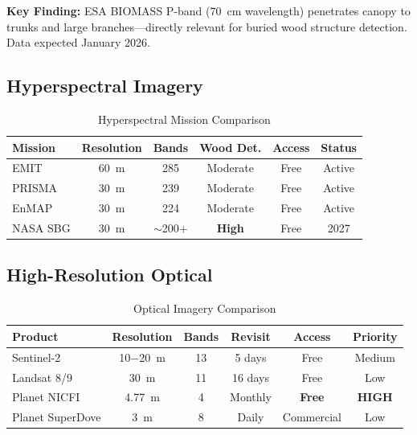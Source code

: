 \documentclass[11pt,letterpaper]{article}
\begin{document}
\textbf{Key Finding:} ESA BIOMASS P-band (\SI{70}{cm} wavelength) penetrates canopy to trunks and large branches---directly relevant for buried wood structure detection. Data expected January 2026.

\subsection{Hyperspectral Imagery}

\begin{table}[h]
\centering
\caption{Hyperspectral Mission Comparison}
\label{tab:hyperspectral_comparison}
\begin{tabular}{p{2.5cm}ccccc}
\toprule
\textbf{Mission} & \textbf{Resolution} & \textbf{Bands} & \textbf{Wood Det.} & \textbf{Access} & \textbf{Status} \\
\midrule
EMIT & \SI{60}{m} & 285 & Moderate & Free & Active \\
PRISMA & \SI{30}{m} & 239 & Moderate & Free & Active \\
EnMAP & \SI{30}{m} & 224 & Moderate & Free & Active \\
\rowcolor{inprogress!30}
NASA SBG & \SI{30}{m} & $\sim$200+ & \textbf{High} & Free & 2027 \\
\bottomrule
\end{tabular}
\end{table}

\subsection{High-Resolution Optical}

\begin{table}[h]
\centering
\caption{Optical Imagery Comparison}
\label{tab:optical_comparison}
\begin{tabular}{p{2.5cm}ccccc}
\toprule
\textbf{Product} & \textbf{Resolution} & \textbf{Bands} & \textbf{Revisit} & \textbf{Access} & \textbf{Priority} \\
\midrule
Sentinel-2 & \SI{10-20}{m} & 13 & 5 days & Free & Medium \\
Landsat 8/9 & \SI{30}{m} & 11 & 16 days & Free & Low \\
\rowcolor{complete!30}
Planet NICFI & \SI{4.77}{m} & 4 & Monthly & \textbf{Free} & \textbf{HIGH} \\
Planet SuperDove & \SI{3}{m} & 8 & Daily & Commercial & Low \\
\bottomrule
\end{tabular}
\end{table}
\end{document}
